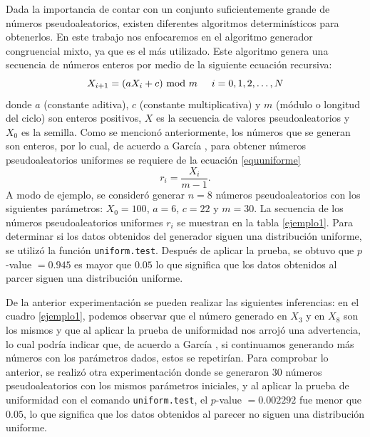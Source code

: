 \documentclass{article}
\begin{document}
Dada la importancia de contar con un conjunto suficientemente grande de números pseudoaleatorios, existen diferentes algoritmos determinísticos para obtenerlos. En este trabajo nos enfocaremos en el algoritmo generador congruencial mixto, ya que es el más utilizado. Este algoritmo genera una secuencia de números enteros por medio de la siguiente ecuación recursiva:
\begin{equation} \label{recursiva}
X_ {i+1}= (aX_{i} +c) \text{ mod } m \hspace{0,5cm}i=0, 1, 2, \dots, N
\end{equation}
\noindent donde $a$ (constante aditiva), $c$ (constante multiplicativa) y $m$ (módulo o longitud del ciclo) son enteros positivos, $X$ es la secuencia de valores pseudoaleatorios y $X_ {0}$ es la semilla. Como se mencionó anteriormente, los números que se generan son enteros, por lo cual, de acuerdo a García \cite{promodel}, para obtener números pseudoaleatorios uniformes se requiere de la ecuación \ref{equuniforme}
\begin{equation} \label{equuniforme}
r_ {i}=\frac{X_{i}}{m-1}.
\end{equation}
A modo de ejemplo, se consideró generar $n=8$ números pseudoaleatorios con los siguientes parámetros: $X_{0}=100$, $a = 6$, $c = 22$ y $m = 30$. La secuencia de los números pseudoaleatorios uniformes $r_{i}$ se muestran en la tabla \ref{ejemplo1}. Para determinar si los datos obtenidos del generador siguen una distribución uniforme, se utilizó la función \texttt{uniform.test}. Después de aplicar la prueba, se obtuvo que $p$-value $= 0.945$ es mayor que $0.05$ lo que significa que los datos obtenidos al parcer siguen una distribución uniforme. 

De la anterior experimentación se pueden realizar las siguientes inferencias: en el cuadro \ref{ejemplo1}, podemos observar que el número generado en $X_{3}$ y en $X_{8}$ son los mismos y que al aplicar la prueba de uniformidad nos arrojó una advertencia, lo cual podría indicar que, de acuerdo a García \cite{promodel}, si continuamos generando más números con los parámetros dados, estos se repetirían. Para comprobar lo anterior, se realizó otra experimentación donde se generaron $30$ números pseudoaleatorios con los mismos parámetros iniciales, y al aplicar la prueba de uniformidad con el comando \texttt{uniform.test}, el $p$-value $= 0.002292$ fue menor que $0.05$, lo que significa que los datos obtenidos al parecer no siguen una distribución uniforme.
\end{document}
